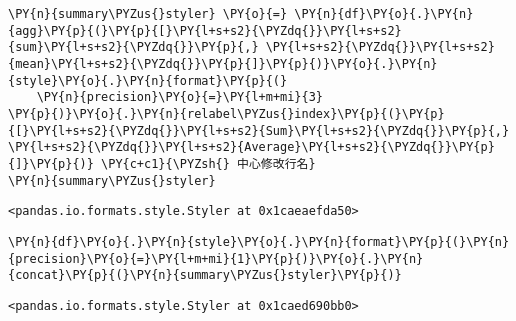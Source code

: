     \begin{tcolorbox}[breakable, size=fbox, boxrule=1pt, pad at break*=1mm,colback=cellbackground, colframe=cellborder]
\begin{Verbatim}[commandchars=\\\{\}]
\PY{n}{summary\PYZus{}styler} \PY{o}{=} \PY{n}{df}\PY{o}{.}\PY{n}{agg}\PY{p}{(}\PY{p}{[}\PY{l+s+s2}{\PYZdq{}}\PY{l+s+s2}{sum}\PY{l+s+s2}{\PYZdq{}}\PY{p}{,} \PY{l+s+s2}{\PYZdq{}}\PY{l+s+s2}{mean}\PY{l+s+s2}{\PYZdq{}}\PY{p}{]}\PY{p}{)}\PY{o}{.}\PY{n}{style}\PY{o}{.}\PY{n}{format}\PY{p}{(}
    \PY{n}{precision}\PY{o}{=}\PY{l+m+mi}{3}
\PY{p}{)}\PY{o}{.}\PY{n}{relabel\PYZus{}index}\PY{p}{(}\PY{p}{[}\PY{l+s+s2}{\PYZdq{}}\PY{l+s+s2}{Sum}\PY{l+s+s2}{\PYZdq{}}\PY{p}{,} \PY{l+s+s2}{\PYZdq{}}\PY{l+s+s2}{Average}\PY{l+s+s2}{\PYZdq{}}\PY{p}{]}\PY{p}{)} \PY{c+c1}{\PYZsh{} 中心修改行名}
\PY{n}{summary\PYZus{}styler}
\end{Verbatim}
\end{tcolorbox}

            \begin{tcolorbox}[breakable, size=fbox, boxrule=.5pt, pad at break*=1mm, opacityfill=0]
\begin{Verbatim}[commandchars=\\\{\}]
<pandas.io.formats.style.Styler at 0x1caeaefda50>
\end{Verbatim}
\end{tcolorbox}
        
    \begin{tcolorbox}[breakable, size=fbox, boxrule=1pt, pad at break*=1mm,colback=cellbackground, colframe=cellborder]
\begin{Verbatim}[commandchars=\\\{\}]
\PY{n}{df}\PY{o}{.}\PY{n}{style}\PY{o}{.}\PY{n}{format}\PY{p}{(}\PY{n}{precision}\PY{o}{=}\PY{l+m+mi}{1}\PY{p}{)}\PY{o}{.}\PY{n}{concat}\PY{p}{(}\PY{n}{summary\PYZus{}styler}\PY{p}{)}
\end{Verbatim}
\end{tcolorbox}

            \begin{tcolorbox}[breakable, size=fbox, boxrule=.5pt, pad at break*=1mm, opacityfill=0]
\begin{Verbatim}[commandchars=\\\{\}]
<pandas.io.formats.style.Styler at 0x1caed690bb0>
\end{Verbatim}
\end{tcolorbox}